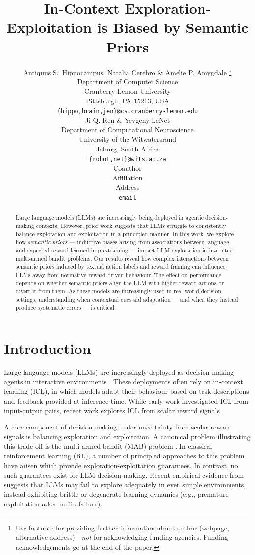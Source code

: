 \documentclass{article} %
\title{In-Context Exploration-Exploitation is Biased by Semantic Priors}
\author{Antiquus S.~Hippocampus, Natalia Cerebro \& Amelie P. Amygdale \thanks{ Use footnote for providing further information
about author (webpage, alternative address)---\emph{not} for acknowledging
funding agencies.  Funding acknowledgements go at the end of the paper.} \\
Department of Computer Science\\
Cranberry-Lemon University\\
Pittsburgh, PA 15213, USA \\
\texttt{\{hippo,brain,jen\}@cs.cranberry-lemon.edu} \\
\And
Ji Q. Ren \& Yevgeny LeNet \\
Department of Computational Neuroscience \\
University of the Witwatersrand \\
Joburg, South Africa \\
\texttt{\{robot,net\}@wits.ac.za} \\
\AND
Coauthor \\
Affiliation \\
Address \\
\texttt{email}
}
\begin{document}
\ifcolmsubmission
\linenumbers
\fi

\maketitle

\begin{abstract}
Large language models (LLMs) are increasingly being deployed in agentic decision-making contexts. However, prior work suggests that LLMs struggle to consistently balance exploration and exploitation in a principled manner. In this work, we explore how \textit{semantic priors} --- inductive biases arising from associations between language and expected reward learned in pre-training --- impact LLM exploration in in-context multi-armed bandit problems. Our results reveal how complex interactions between semantic priors induced by textual action labels and reward framing can influence LLMs away from normative reward-driven behaviour. The effect on performance depends on whether semantic priors align the LLM with higher-reward actions or divert it from them. As these models are increasingly used in real-world decision settings, understanding when contextual cues aid adaptation — and when they instead produce systematic errors — is critical.
\end{abstract}

\section{Introduction}
Large language models (LLMs) are increasingly deployed as decision-making agents in interactive environments \citep{drouinWorkArenaHowCapable2024, zhouWebArenaRealisticWeb2023}. These deployments often rely on in-context learning (ICL), in which models adapt their behaviour based on task descriptions and feedback provided at inference time. While early work investigated ICL from input-output pairs, recent work explores ICL from scalar reward signals \citep{monea_bandit, zhang_bandit, Song_rewardisenough}. 

A core component of decision-making under uncertainty from scalar reward signals is balancing exploration and exploitation. A canonical problem illustrating this trade-off is the multi-armed bandit (MAB) problem \citep{suttonReinforcementLearningIntroduction2020}. In classical reinforcement learning (RL), a number of principled approaches to this problem have arisen which provide exploration-exploitation guarantees. In contrast, no such guarantees exist for LLM decision-making. Recent empirical evidence from \citet{krishna_icl} suggests that LLMs may fail to explore adequately in even simple environments, instead exhibiting brittle or degenerate learning dynamics (e.g., premature exploitation a.k.a. suffix failure).
\end{document}
